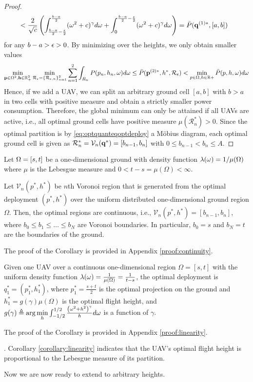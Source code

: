 \documentclass[smallabstract,smallcaptions]{dccpaper}
\newenvironment{remark}{\par\vspace{1.5ex}\noindent{\em Remark\/}.}{\par\vspace{1.5ex}}
\newcommand{\df}{\ensuremath{\lam}}         %
\newcommand{\Pbar}{\ensuremath{\bar{P}}}         %
\newcommand{\Vor}{\ensuremath{\mathcal{V}}}         %
\newcommand{\Rset}{\ensuremath{\mathcal R}}
\newcommand{\junstart}{\color{black}}
\newcommand{\junend}{\color{black}}
\begin{document}
\begin{proof}
\begin{align}
    &< \frac{2}{\sqrt{c}}\left( \int_{\frac{b-a}{2} -\frac{\eps}{2}}^{\frac{b-a}{2}} (\ome^2+c)^{\gam}d\ome
    +\int_{0}^{\frac{b-a}{2}-\frac{\eps}{2}} (\ome^2+c)^{\gam} d\ome\right)=\Pbar(\vq^{(1)*},[a,b])\notag
  \end{align}
  for any $b-a>\epsilon>0$. By minimizing over the heights, we only obtain smaller values
  \begin{align}
    \min_{ \vp\in\Ome^2, \vh\in\R_+^2} \min_{\Rset_{\eps}=\{\Rset_{\eps,n}\}_{n=1}^2}
    \sum_{n=1}^2 \int_{R_n} P(p_n,h_n,\ome)d\ome \leq
    \Pbar(\vp^{(2)*},h^*,\Rset_{\eps}) < \min_{p\in\Ome,h\in\R+} \Pbar(p,h,\ome)d\ome\notag
  \end{align}
  Hence, if we add a UAV, we can split an arbitrary ground cell $[a,b]$ with $b>a$ in two cells with positive measure
  and obtain a strictly smaller power consumption. Therefore, the global minimum can only be attained if all UAVs are
  active, i.e., all optimal ground cells have positive measure $\mu(\Rset^*_n)>0$. Since the optimal partition is by
  \eqref{eq:optquanteqoptdeploy} a Möbius diagram, each optimal ground cell is given as
  $\Rset^*_n=\Vor_n(\vq^*)=[b_{n-1},b_n]$ with $0 \leq b_{n-1}<b_n\leq A$. 
\end{proof}

%
\junstart
%
Let $\Omega=[s,t]$ be a one-dimensional ground with density function $\df(\ome)=1/\mu(\Omega)$ where $\mu$ is the Lebesgue
measure and $0<t-s=\mu(\Omega)<\infty$.
%
\begin{corollary}
%
Let $\Vor_n(p^*, h^*)$ be $n$th Voronoi region that is generated from the optimal deployment $(p^*, h^*)$ over the
uniform distributed one-dimensional ground region $\Omega$. Then, the optimal regions are continuous, i.e., $\Vor_n(p^*,
h^*)=[b_{n-1}, b_n]$, where $b_0\le b_1 \le \dots\le b_N$ are Voronoi boundaries. In particular, $b_0 = s$ and $b_N = t$
are the boundaries of the ground.
\label{corollary:continuity}
\end{corollary}
The proof of the Corollary is provided in Appendix \ref{proof:continuity}.

\begin{corollary}
Given one UAV over a continuous one-dimensional region $\Omega=[s,t]$ with the uniform density function
$\lambda(\omega)=\frac{1}{\mu\left(\Omega\right)}=\frac{1}{t-s}$, the optimal deployment is $q^*_1=\left(p^*_1,
h^*_1\right)$, where $p^*_1=\frac{s+t}{2}$ is the optimal projection on the ground and
$h^*_1=g(\gamma)\mu\left(\Omega\right)$ is the optimal flight height, and
$g(\gamma)\triangleq\arg\min\limits_{h}\int_{-1/2}^{1/2} \frac{\left(\omega^2 + h^2\right)^{\gamma}}{h} d\omega$ is a function
of $\gamma$.
\label{corollary:linearity}
\end{corollary}
%
The proof of the Corollary is provided in Appendix \ref{proof:linearity}.
%
\begin{remark}
  Corollary \ref{corollary:linearity} indicates that the UAV's optimal flight height is proportional to the Lebesgue
  measure of its partition.
\end{remark}
\fi
%
\junend
Now we are now ready to extend  to arbitrary heights.
%
\end{document}
